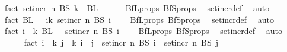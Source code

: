 \begin{isabellebody}
\ fact{}{\isacharcolon}{\kern0pt}\ {\isachardoublequoteopen}set{\isacharunderscore}{\kern0pt}incr\ n\ {\isacharparenleft}{\kern0pt}BS\ k{\isacharparenright}{\kern0pt}\ {\isasyminter}\ BL\ {}\ {\isacharequal}{\kern0pt}\ {\isacharbraceleft}{\kern0pt}{\isacharbraceright}{\kern0pt}{\isachardoublequoteclose}\ \ \isamarkupfalse%
\ BfL{\isacharunderscore}{\kern0pt}props\ BfS{\isacharunderscore}{\kern0pt}props\ \isamarkupfalse%
\ set{\isacharunderscore}{\kern0pt}incr{\isacharunderscore}{\kern0pt}def\ \isamarkupfalse%
\ auto\isanewline
\ \ \ \ \isamarkupfalse%
\ fact{}{\isacharcolon}{\kern0pt}\ {\isachardoublequoteopen}BL\ {}\ {\isasyminter}\ {\isacharparenleft}{\kern0pt}{\isasymUnion}i{\isasymin}{\isacharbraceleft}{\kern0pt}{\isachardot}{\kern0pt}{\isachardot}{\kern0pt}{\isacharless}{\kern0pt}k{\isacharbraceright}{\kern0pt}{\isachardot}{\kern0pt}\ set{\isacharunderscore}{\kern0pt}incr\ n\ {\isacharparenleft}{\kern0pt}BS\ i{\isacharparenright}{\kern0pt}{\isacharparenright}{\kern0pt}\ {\isacharequal}{\kern0pt}\ {\isacharbraceleft}{\kern0pt}{\isacharbraceright}{\kern0pt}{\isachardoublequoteclose}\ \isamarkupfalse%
\ BfL{\isacharunderscore}{\kern0pt}props\ BfS{\isacharunderscore}{\kern0pt}props\ \isamarkupfalse%
\ set{\isacharunderscore}{\kern0pt}incr{\isacharunderscore}{\kern0pt}def\ \isamarkupfalse%
\ auto\isanewline
\ \ \ \ \isamarkupfalse%
\ fact{}{\isacharcolon}{\kern0pt}\ {\isachardoublequoteopen}{\isasymforall}i\ {\isasymin}\ {\isacharbraceleft}{\kern0pt}{\isachardot}{\kern0pt}{\isachardot}{\kern0pt}{\isacharless}{\kern0pt}k{\isacharbraceright}{\kern0pt}{\isachardot}{\kern0pt}\ BL\ {}\ {\isasyminter}\ set{\isacharunderscore}{\kern0pt}incr\ n\ {\isacharparenleft}{\kern0pt}BS\ i{\isacharparenright}{\kern0pt}\ {\isacharequal}{\kern0pt}\ {\isacharbraceleft}{\kern0pt}{\isacharbraceright}{\kern0pt}{\isachardoublequoteclose}\ \isamarkupfalse%
\ BfL{\isacharunderscore}{\kern0pt}props\ BfS{\isacharunderscore}{\kern0pt}props\ \isamarkupfalse%
\ set{\isacharunderscore}{\kern0pt}incr{\isacharunderscore}{\kern0pt}def\ \isamarkupfalse%
\ auto\isanewline
\ \ \ \ \isamarkupfalse%
\ fact{}{\isacharcolon}{\kern0pt}\ {\isachardoublequoteopen}{\isasymforall}i\ {\isasymin}\ {\isacharbraceleft}{\kern0pt}{\isachardot}{\kern0pt}{\isachardot}{\kern0pt}{\isacharless}{\kern0pt}k{\isacharplus}{\kern0pt}{}{\isacharbraceright}{\kern0pt}{\isachardot}{\kern0pt}\ {\isasymforall}j\ {\isasymin}\ {\isacharbraceleft}{\kern0pt}{\isachardot}{\kern0pt}{\isachardot}{\kern0pt}{\isacharless}{\kern0pt}k{\isacharplus}{\kern0pt}{}{\isacharbraceright}{\kern0pt}{\isachardot}{\kern0pt}\ i\ {\isasymnoteq}\ j\ {\isasymlongrightarrow}\ set{\isacharunderscore}{\kern0pt}incr\ n\ {\isacharparenleft}{\kern0pt}BS\ i{\isacharparenright}{\kern0pt}\ {\isasyminter}\ set{\isacharunderscore}{\kern0pt}incr\ n\ {\isacharparenleft}{\kern0pt}BS\ j{\isacharparenright}{\kern0pt}\ {\isacharequal}{\kern0pt}\ {\isacharbraceleft}{\kern0pt}{\isacharbraceright}{\kern0pt}{\isachardoublequoteclose}\ \isamarkupfalse%

\end{isabellebody}
